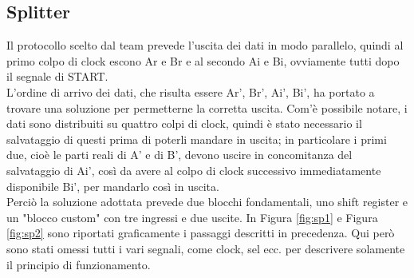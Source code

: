 \documentclass[a4paper, titlepage]{article}
\begin{document}
\subsection{Splitter}%
Il protocollo scelto dal team prevede l'uscita dei dati in modo parallelo, quindi al primo colpo di clock escono Ar e Br e al secondo Ai e Bi, ovviamente tutti dopo il segnale di START.\\L'ordine di arrivo dei dati, che risulta essere Ar', Br', Ai', Bi', ha portato a trovare una soluzione per permetterne la corretta uscita. Com'è possibile notare, i dati sono distribuiti su quattro colpi di clock, quindi è stato necessario il salvataggio di questi prima di poterli mandare in uscita; in particolare i primi due, cioè le parti reali di A' e di B', devono uscire in concomitanza del salvataggio di Ai', così da avere al colpo di clock successivo immediatamente disponibile Bi', per mandarlo così in uscita.\\Perciò la soluzione adottata prevede due blocchi fondamentali, uno shift register e un "blocco custom" con tre ingressi e due uscite. In Figura \ref{fig:sp1} e Figura \ref{fig:sp2} sono riportati graficamente i passaggi descritti in precedenza. Qui però sono stati omessi tutti i vari segnali, come clock, sel ecc. per descrivere solamente il principio di funzionamento.\\
\end{document}
